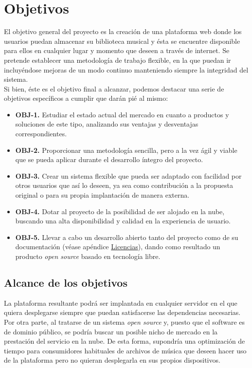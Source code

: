 \chapter{Objetivos}
\label{cap:objetivos}

El objetivo general del proyecto es la creación de una plataforma web donde los usuarios puedan almacenar su biblioteca musical y ésta se encuentre disponible para ellos en cualquier lugar y momento que deseen a través de internet. Se pretende establecer una metodología de trabajo flexible, en la que puedan ir incluyéndose mejoras de un modo continuo manteniendo siempre la integridad del sistema. \\

Si bien, éste es el objetivo final a alcanzar, podemos destacar una serie de objetivos específicos a cumplir que darán pié al mismo:

\begin{itemize}
	\item \textbf{OBJ-1.} Estudiar el estado actual del mercado en cuanto a productos y soluciones de este tipo, analizando sus ventajas y desventajas correspondientes.

	\item \textbf{OBJ-2.} Proporcionar una metodología sencilla, pero a la vez ágil y viable que se pueda aplicar durante el desarrollo íntegro del proyecto. 

	\item \textbf{OBJ-3.} Crear un sistema flexible que pueda ser adaptado con facilidad por otros usuarios que así lo deseen, ya sea como contribución a la propuesta original o para su propia implantación de manera externa.

	\item \textbf{OBJ-4.} Dotar al proyecto de la posibilidad de ser alojado en la nube, buscando una alta disponibilidad y calidad en la experiencia de usuario.

	\item \textbf{OBJ-5.} Llevar a cabo un desarrollo abierto tanto del proyecto como de su documentación (véase apéndice \hyperref[sec:licencias]{Licencias}), dando como resultado un producto \textit{open source} basado en tecnología libre.
\end{itemize}

\bigskip

\section{Alcance de los objetivos}

La plataforma resultante podrá ser implantada en cualquier servidor en el que quiera desplegarse siempre que puedan satisfacerse las dependencias necesarias. Por otra parte, al tratarse de un sistema \textit{open source} y, puesto que el software es de dominio público, se podría buscar un posible nicho de mercado en la prestación del servicio en la nube. De esta forma, supondría una optimización de tiempo para consumidores habituales de archivos de música que deseen hacer uso de la plataforma pero no quieran desplegarla en sus propios dispositivos.
